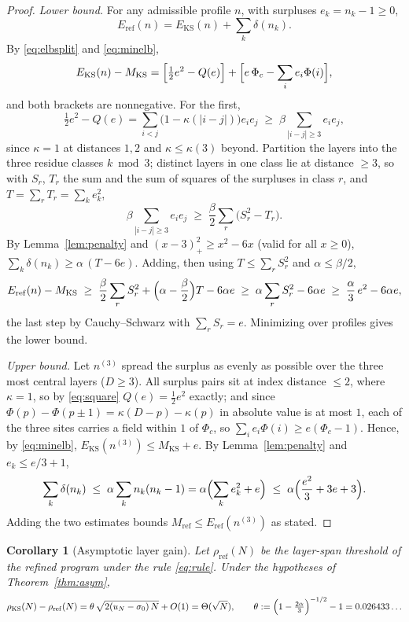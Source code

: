 \documentclass[11pt]{article}
\newtheorem{corollary}{Corollary}
\theoremstyle{remark}
\newcommand{\KS}{\mathrm{KS}}
\newcommand{\refi}{\mathrm{ref}}
\begin{document}
\begin{proof}
\emph{Lower bound.} For any admissible profile $n$, with surpluses $e_k=n_k-1\ge0$,
\[
E_\refi(n) = E_\KS(n) + \sum_k \delta(n_k).
\]
By \eqref{eq:elbsplit} and \eqref{eq:minelb},
\[
E_\KS(n)-M_\KS = \Bigl[\tfrac12 e^2 - Q(e)\Bigr] + \Bigl[e\,\Phi_c - \sum_i e_i\Phi(i)\Bigr],
\]
and both brackets are nonnegative. For the first,
\[
\tfrac12 e^2 - Q(e) = \sum_{i<j}\bigl(1-\kappa(|i-j|)\bigr)e_i e_j \;\ge\; \beta \!\!\sum_{|i-j|\ge3}\!\! e_i e_j,
\]
since $\kappa=1$ at distances $1,2$ and $\kappa\le\kappa(3)$ beyond. Partition the layers into the three residue classes $k\bmod3$; distinct layers in one class lie at distance $\ge3$, so with $S_r$, $T_r$ the sum and the sum of squares of the surpluses in class $r$, and $T=\sum_r T_r=\sum_k e_k^2$,
\[
\beta \!\!\sum_{|i-j|\ge3}\!\! e_i e_j \;\ge\; \frac\beta2 \sum_r \bigl(S_r^2 - T_r\bigr).
\]
By Lemma~\ref{lem:penalty} and $(x-3)_+^2\ge x^2-6x$ (valid for all $x\ge0$), $\sum_k\delta(n_k)\ge\alpha\,(T-6e)$. Adding, then using $T\le\sum_r S_r^2$ and $\alpha\le\beta/2$,
\[
E_\refi(n)-M_\KS \;\ge\; \frac\beta2\sum_r S_r^2 + \Bigl(\alpha-\frac\beta2\Bigr)T - 6\alpha e
\;\ge\; \alpha\sum_r S_r^2 - 6\alpha e
\;\ge\; \frac\alpha3\,e^2 - 6\alpha e,
\]
the last step by Cauchy--Schwarz with $\sum_r S_r=e$. Minimizing over profiles gives the lower bound.

\emph{Upper bound.} Let $n^{(3)}$ spread the surplus as evenly as possible over the three most central layers ($D\ge3$). All surplus pairs sit at index distance $\le2$, where $\kappa=1$, so by \eqref{eq:square} $Q(e)=\tfrac12 e^2$ exactly; and since $\Phi(p)-\Phi(p\pm1)=\kappa(D-p)-\kappa(p)$ in absolute value is at most $1$, each of the three sites carries a field within $1$ of $\Phi_c$, so $\sum_i e_i\Phi(i)\ge e(\Phi_c-1)$. Hence, by \eqref{eq:minelb}, $E_\KS(n^{(3)})\le M_\KS+e$. By Lemma~\ref{lem:penalty} and $e_k\le e/3+1$,
\[
\sum_k \delta(n_k) \;\le\; \alpha\sum_k n_k(n_k-1) = \alpha\Bigl(\sum_k e_k^2 + e\Bigr) \;\le\; \alpha\Bigl(\frac{e^2}3+3e+3\Bigr).
\]
Adding the two estimates bounds $M_\refi\le E_\refi(n^{(3)})$ as stated.
\end{proof}

\begin{corollary}[Asymptotic layer gain]\label{cor:gain}
Let $\rho_\refi(N)$ be the layer-span threshold of the refined program under the rule \eqref{eq:rule}. Under the hypotheses of Theorem~\ref{thm:asym},
\[
\rho_\KS(N)-\rho_\refi(N) = \theta\,\sqrt{2(u_N-\sigma_0)\,N} + O(1) = \Theta(\sqrt N),
\qquad
\theta := \Bigl(1-\tfrac{2\alpha}3\Bigr)^{-1/2}-1 = 0.026433\ldots
\]
\end{corollary}
\end{document}
